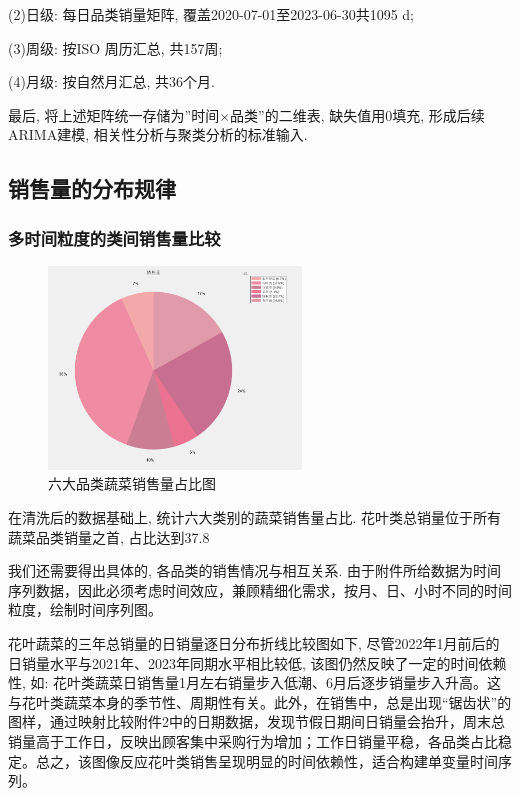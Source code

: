 \documentclass{cumcmthesis}
\begin{document}
(2)日级: 每日品类销量矩阵, 覆盖2020-07-01至2023-06-30共1095 d;   

(3)周级: 按ISO 周历汇总, 共157周;   

(4)月级: 按自然月汇总, 共36个月. 

最后, 将上述矩阵统一存储为''时间$\times$品类''的二维表, 缺失值用0填充, 形成后续ARIMA建模, 相关性分析与聚类分析的标准输入. 

\subsection{销售量的分布规律}

\subsubsection{多时间粒度的类间销售量比较}
\begin{figure}[H]
    \centering
    \includegraphics[width=0.6\textwidth]{销售量占比.png} 
    \caption{六大品类蔬菜销售量占比图}
\end{figure}

在清洗后的数据基础上, 统计六大类别的蔬菜销售量占比. 花叶类总销量位于所有蔬菜品类销量之首, 占比达到37.8%

我们还需要得出具体的, 各品类的销售情况与相互关系. 由于附件所给数据为时间序列数据，因此必须考虑时间效应，兼顾精细化需求，按月、日、小时不同的时间粒度，绘制时间序列图。

花叶蔬菜的三年总销量的日销量逐日分布折线比较图如下, 尽管2022年1月前后的日销量水平与2021年、2023年同期水平相比较低, 该图仍然反映了一定的时间依赖性, 如: 花叶类蔬菜日销售量1月左右销量步入低潮、6月后逐步销量步入升高。这与花叶类蔬菜本身的季节性、周期性有关。此外，在销售中，总是出现“锯齿状”的图样，通过映射比较附件2中的日期数据，发现节假日期间日销量会抬升，周末总销量高于工作日，反映出顾客集中采购行为增加；工作日销量平稳，各品类占比稳定。总之，该图像反应花叶类销售呈现明显的时间依赖性，适合构建单变量时间序列。
\end{document}
